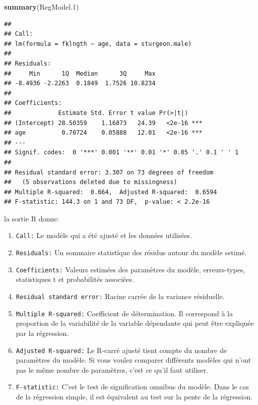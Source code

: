 \documentclass[12pt,]{book}
\newenvironment{Shaded}{\begin{snugshade}}{\end{snugshade}}
\newcommand{\FloatTok}[1]{\textcolor[rgb]{0.00,0.00,0.81}{#1}}
\newcommand{\KeywordTok}[1]{\textcolor[rgb]{0.13,0.29,0.53}{\textbf{#1}}}
\newcommand{\NormalTok}[1]{#1}
\providecommand{\tightlist}{%
  \setlength{\itemsep}{0pt}\setlength{\parskip}{0pt}}
\begin{document}
\begin{Shaded}
\begin{Highlighting}[]
\KeywordTok{summary}\NormalTok{(RegModel}\FloatTok{.1}\NormalTok{)}
\end{Highlighting}
\end{Shaded}

\begin{verbatim}
## 
## Call:
## lm(formula = fklngth ~ age, data = sturgeon.male)
## 
## Residuals:
##     Min      1Q  Median      3Q     Max 
## -8.4936 -2.2263  0.1849  1.7526 10.8234 
## 
## Coefficients:
##             Estimate Std. Error t value Pr(>|t|)    
## (Intercept) 28.50359    1.16873   24.39   <2e-16 ***
## age          0.70724    0.05888   12.01   <2e-16 ***
## ---
## Signif. codes:  0 '***' 0.001 '**' 0.01 '*' 0.05 '.' 0.1 ' ' 1
## 
## Residual standard error: 3.307 on 73 degrees of freedom
##   (5 observations deleted due to missingness)
## Multiple R-squared:  0.664,  Adjusted R-squared:  0.6594 
## F-statistic: 144.3 on 1 and 73 DF,  p-value: < 2.2e-16
\end{verbatim}

la sortie R donne:

\begin{enumerate}
\def\labelenumi{\arabic{enumi}.}
\tightlist
\item
  \texttt{Call:} Le modèle qui a été ajusté et les données utilisées.
\item
  \texttt{Residuals:} Un sommaire statistique des résidus autour du modèle estimé.
\item
  \texttt{Coefficients:} Valeurs estimées des paramètres du modèle, erreurs-types, statistiques t et probabilités associées.
\item
  \texttt{Residual\ standard\ error:} Racine carrée de la variance résiduelle.
\item
  \texttt{Multiple\ R-squared:} Coefficient de détermination. Il correspond à la proportion de la variabilité de la variable dépendante qui peut être expliquée par la régression.
\item
  \texttt{Adjusted\ R-squared:} Le R-carré ajusté tient compte du nombre de paramètres du modèle. Si vous voulez comparer différents modèles qui n'ont pas le même nombre de paramètres, c'est ce qu'il faut utiliser.
\item
  \texttt{F-statistic:} C'est le test de signification omnibus du modèle. Dans le cas de la régression simple, il est équivalent au test sur la pente de la régression.
\end{enumerate}
\end{document}
